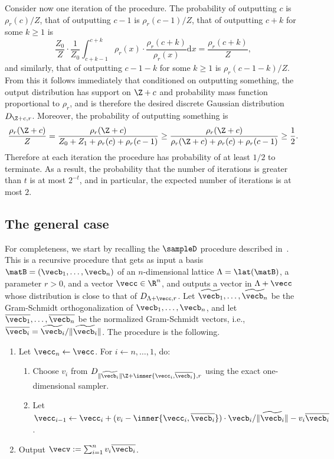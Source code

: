 Consider now one iteration of the procedure. The probability of outputting $c$ is $\rho_r(c)/Z$, that of outputting $c-1$ 
is $\rho_r(c-1)/Z$, that of outputting $c+k$ for some $k \ge 1$ is
\[
\frac{Z_0}{Z} \cdot \frac{1}{Z_0} \int_{c+k-1}^{c+k} \rho_r(x) \cdot \frac{\rho_r(c+k)}{\rho_r(x)}  \mathrm{d} x
= \frac{\rho_r(c+k)}{Z},
\]
and similarly, that of outputting $c-1-k$ for some $k \ge 1$ is 
$\rho_r(c-1-k)/Z$. From this it follows immediately that conditioned on outputting something, the output
distribution has support on $\Z+c$ and probability mass function proportional to $\rho_r$, and is therefore the desired discrete
Gaussian distribution $D_{\Z+c,r}$. Moreover, the probability of outputting something is
\[
\frac{\rho_r(\Z+c)}{Z} = \frac{\rho_r(\Z+c)}{Z_0+Z_1+\rho_r(c)+\rho_r(c-1)} \ge \frac{\rho_r(\Z+c)}{\rho_r(\Z+c)+\rho_r(c)+\rho_r(c-1)}
\ge \frac{1}{2}.
\]
Therefore at each iteration the procedure has probability of at least $1/2$ to terminate. As a result, the probability that the 
number of iterations is greater than $t$ is at most $2^{-t}$, and in particular, the expected number of iterations
is at most $2$.

\subsection{The general case}

For completeness, we start by recalling the $\sampleD$ procedure described in~\cite{DBLP:conf/stoc/GentryPV08}.
This is a recursive procedure that gets as input a basis $\matB=(\vecb_1,\ldots,\vecb_n)$ of an $n$-dimensional lattice $\Lambda=\lat(\matB)$, a parameter $r>0$, 
and a vector $\vecc \in \R^n$, and outputs a vector in $\Lambda+\vecc$ whose distribution is close to that of 
$D_{\Lambda+\vecc,r}$. Let $\widetilde{\vecb_1},\ldots,\widetilde{\vecb_n}$
be the Gram-Schmidt orthogonalization of $\vecb_1,\ldots,\vecb_n$, and let $\overline{\vecb_1},\ldots,\overline{\vecb_n}$ be the
normalized Gram-Schmidt vectors, i.e., $\overline{\vecb_i} = \widetilde{\vecb_i}/\|\widetilde{\vecb_i}\|$. The procedure is the following. 

\begin{enumerate}
\item Let $\vecc_n \leftarrow \vecc$. For $i \leftarrow n,\ldots,1$, do:
\begin{enumerate}
	\item Choose $v_i$ from $D_{\|\widetilde{\vecb_i}\| \Z+\inner{\vecc_i,\overline{\vecb_i}}, r}$ using the exact one-dimensional sampler.
	\item Let $\vecc_{i-1} \leftarrow \vecc_i + (v_i - \inner{\vecc_i, \overline{\vecb_i}}) \cdot \vecb_i / \|\widetilde{\vecb_i}\| - v_i \overline{\vecb_i}$.
\end{enumerate}	
\item Output $\vecv := \sum_{i=1}^n v_i \overline{\vecb_i}$.
\end{enumerate}

